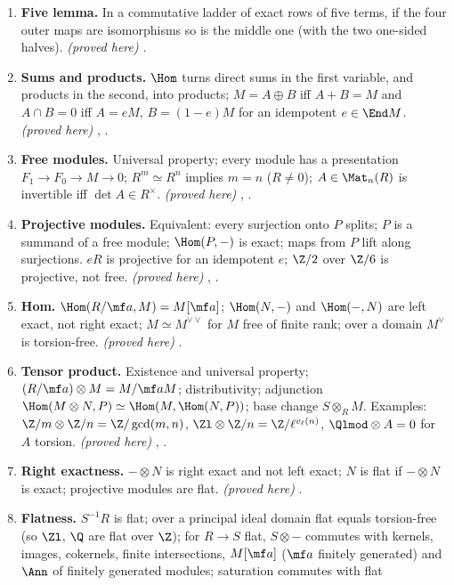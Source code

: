 \begin{enumerate}[label=\textbf{\thechapter.\arabic*}]
finite abelian group. \emph{(proved here)} .
\item \textbf{Five lemma.} In a commutative ladder of exact rows of five terms, if the four outer maps are isomorphisms so is the middle one (with the two
one-sided halves). \emph{(proved here)} .
\item \textbf{Sums and products.} $\Hom$ turns direct sums in the first variable, and products in the second, into products; $M=A\oplus B$ iff $A+B=M$ and $A\cap B=0$ iff $A=eM$,
$B=(1-e)M$ for an idempotent $e\in\End M$. \emph{(proved here)} , .
\item \textbf{Free modules.} Universal property; every module has a presentation $F_1\to F_0\to M\to0$; $R^m\simeq R^n$ implies $m=n$ ($R\ne0$); $A\in\Mat_n(R)$ is invertible iff
$\det A\in R^\times$. \emph{(proved here)} , .
\item \textbf{Projective modules.} Equivalent: every surjection onto $P$ splits; $P$ is a summand of a free module; $\Hom(P,-)$ is exact; maps from $P$ lift along
surjections. $eR$ is projective for an idempotent $e$; $\Z/2$ over $\Z/6$ is projective, not free. \emph{(proved here)} ,
.
\item \textbf{Hom.} $\Hom(R/\mf a,M)=M[\mf a]$; $\Hom(N,-)$ and $\Hom(-,N)$ are left exact, not right exact; $M\simeq M^{\vee\vee}$ for $M$ free of finite rank; over a
domain $M^\vee$ is torsion-free. \emph{(proved here)} .
\item \textbf{Tensor product.} Existence and universal property; $(R/\mf a)\otimes M=M/\mf aM$; distributivity; adjunction $\Hom(M\otimes N,P)\simeq\Hom(M,\Hom(N,P))$; base change
$S\otimes_RM$. Examples: $\Z/m\otimes\Z/n=\Z/\gcd(m,n)$, $\Zl\otimes\Z/n=\Z/\ell^{v_\ell(n)}$, $\Qlmod\otimes A=0$ for $A$ torsion. \emph{(proved here)} ,
.
\item \textbf{Right exactness.} $-\otimes N$ is right exact and not left exact; $N$ is flat if $-\otimes N$ is exact; projective modules are flat. \emph{(proved here)}
.
\item \textbf{Flatness.} $S^{-1}R$ is flat; over a principal ideal domain flat equals torsion-free (so $\Zl$, $\Q$ are flat over $\Z$); for $R\to S$ flat, $S\otimes-$ commutes with
kernels, images, cokernels, finite intersections, $M[\mf a]$ ($\mf a$ finitely generated) and $\Ann$ of finitely generated modules; saturation commutes with flat

\end{enumerate}
